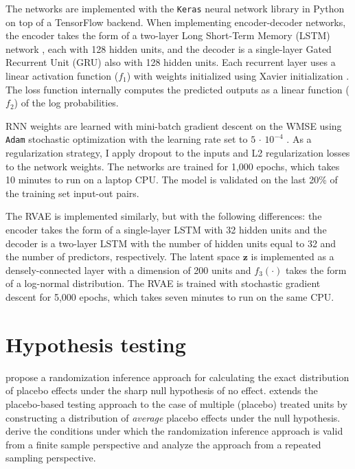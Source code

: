 The networks are implemented with the \texttt{Keras} neural network library \citep{chollet2015keras} in Python on top of a TensorFlow backend. When implementing encoder-decoder networks, the encoder takes the form of a two-layer Long Short-Term Memory (LSTM) network \citep{schmidhuber1997long}, each with 128 hidden units, and the decoder is a single-layer Gated Recurrent Unit (GRU) \citep{chung2014} also with 128 hidden units. Each recurrent layer uses a linear activation function ($f_1$) with weights initialized using Xavier initialization \citep{glorot2010}. The loss function internally computes the predicted outputs as a linear function ($f_2$) of the log probabilities. 

RNN weights are learned with mini-batch gradient descent on the WMSE using \texttt{Adam} stochastic optimization with the learning rate set to $5\,\cdot\,10^{-4}$ \citep{kingma2014adam}. As a regularization strategy, I apply dropout to the inputs and L2 regularization losses to the network weights. The networks are trained for 1,000 epochs, which takes 10 minutes to run on a laptop CPU. The model is validated on the last 20\% of the training set input-out pairs.  

The RVAE is implemented similarly, but with the following differences: the encoder takes the form of a single-layer LSTM with 32 hidden units and the decoder is a two-layer LSTM with the number of hidden units equal to 32 and the number of predictors, respectively. The latent space $\boldsymbol{z}$ is implemented as a densely-connected layer with a dimension of 200 units and $f_3(\cdot)$ takes the form of a log-normal distribution. The RVAE is trained with stochastic gradient descent for 5,000 epochs, which takes seven minutes to run on the same CPU.

\clearpage
\section{Hypothesis testing} \label{eval}

\citet{abadie2010synthetic} propose a randomization inference approach for calculating the exact distribution of placebo effects under the sharp null hypothesis of no effect. \citet{cavallo2013catastrophic} extends the placebo-based testing approach to the case of multiple (placebo) treated units by constructing a distribution of \emph{average} placebo effects under the null hypothesis. \citet{firpo2018synthetic} derive the conditions under which the randomization inference approach is valid from a finite sample perspective and \citet{hahn2017synthetic} analyze the approach from a repeated sampling perspective.

